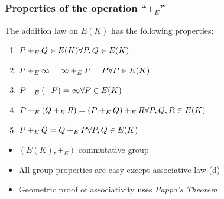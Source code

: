 \documentclass[12pt,handout]{beamer} %
\newcommand{\Q}{\mathbb Q}
\newcommand{\F}{\mathbb F}
\newcommand{\C}{\mathbb C}
\theoremstyle{definition}
\begin{document}
\begin{frame}
\frametitle{Properties of the operation ``$+_E$''}

\begin{Theorem}
 The addition law on $E(K)$ has the following
properties:
\begin{enumerate}[<+-| alert@+>][(a)]
 \item $P+_EQ\in E(K)\hfill\forall P,Q\in E(K)$
 \item  $P+_E\infty=\infty+_E P=P\hfill\forall P\in E(K)$
 \item  $P+_E(-P)=\infty\hfill\forall P\in E(K)$
 \item  $P+_E(Q +_E R)=(P+_E Q)+_E R\hfill\forall P,Q,R\in E(K)$
 \item  $P+_E Q=Q +_E P\hfill\forall P,Q\in E(K)$
\end{enumerate}
 \end{Theorem}\pause

\begin{itemize}[<+-| alert@+>]
 \item $\left(E(K),+_E\right)$  \alert{commutative group}
 \item All group properties are easy except \alert{associative law (d)}
 \item Geometric proof of associativity uses \emph{Pappo's Theorem}
\end{itemize}
\end{frame}
\end{document}
